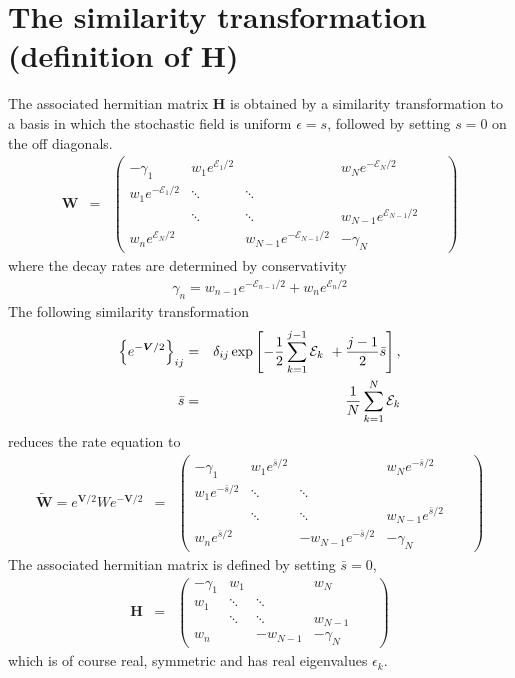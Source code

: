\documentclass[aps,pre,floats,floatfix,twocolumn]{revtex4}
\newcommand{\be}[1]{\begin{eqnarray}\ifthenelse{#1=-1}{\nonumber}{\ifthenelse{#1=0}{}{\label{e#1}}}}
\newcommand{\beq}{\begin{eqnarray}}
\newcommand{\eeq}{\end{eqnarray}}
\begin{document}
\section{ The similarity transformation (definition of H)} 
\label{A3}

The associated hermitian matrix ${\bm H}$ is obtained by a similarity transformation to a basis in 
which the stochastic field is uniform $\epsilon=s$, followed by setting $s=0$ on the off diagonals.
%
\beq
{\bm W}
&=&
\left(
\begin{array}{cccccc}
-\gamma_1 & w_1 e^{\mathcal{E}_1/2}& & w_N e^{-\mathcal{E}_N/2} \\
w_1 e^{-\mathcal{E}_1/2} & \ddots & \ddots&  & & \\
 & \ddots & \ddots & w_{N-1} e^{\mathcal{E}_{N-1}/2}\\
w_n e^{\mathcal{E}_N/2} & &w_{N-1} e^{-\mathcal{E}_{N-1}/2} & -\gamma_N
\end{array}
\right)
\eeq
%
where the decay rates are determined by conservativity
%
\beq
\gamma_n = w_{n-1}e^{-\mathcal{E}_{n-1}/2} + w_{n} e^{\mathcal{E}_n/2}
\eeq
%
The following similarity transformation 
%
\be{3000}
\left\{e^{{-\bm V}/2} \right\}_{ij}& = & \delta_{ij}\exp\left[ -\frac{1}{2}\sum_{k=1}^{j-1} \mathcal{E}_k \ + \frac{j-1}{2}\bar{s}\right], \\
\bar{s} & =  & \frac{1}{N}\sum_{k=1}^N \mathcal{E}_k
\eeq
%
reduces the rate equation to 
%
\beq
{\bm \tilde{W}} = e^{{\bm V/2}} W e^{-{\bm V/2}} &=&
\left(
\begin{array}{cccccc}
-\gamma_1 & w_1 e^{\bar{s}/2}& & w_N e^{-\bar{s}/2} \\
w_1 e^{-\bar{s}/2} & \ddots & \ddots&  & & \\
 & \ddots & \ddots & w_{N-1} e^{\bar{s}/2}\\
w_n e^{\bar{s}/2} & &-w_{N-1} e^{-\bar{s}/2} & -\gamma_N
\end{array}
\right)
\eeq
%
The associated hermitian matrix is defined by setting $\bar{s}=0$,
%
\beq
{\bm H} &=&
\left(
\begin{array}{cccccc}
-\gamma_1 & w_1& & w_N\\
w_1  & \ddots & \ddots&  & & \\
 & \ddots & \ddots & w_{N-1}\\
w_n  & &-w_{N-1}  & -\gamma_N
\end{array}
\right)
\eeq
%
which is of course real, symmetric and has real eigenvalues $\epsilon_k$.
\end{document}
